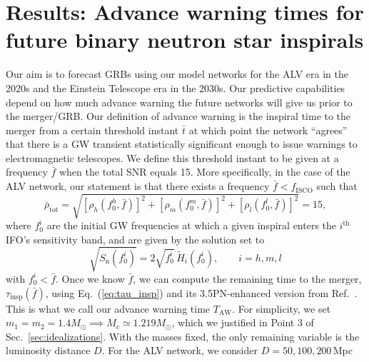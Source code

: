 \documentclass[prd,amsmath,amssymb,aps,floats,amsfonts,notitlepage,superscriptaddress,eqsecnum,nofootinbib,10pt]{revtex4-1}
\newcommand{\f}{\frac}
\newcommand{\be}{\begin{equation}}
\newcommand{\ee}{\end{equation}}
\begin{document}
\section{Results: Advance warning times for future binary neutron star inspirals}\label{sec:results}
 Our aim is to forecast GRBs using our model networks for the ALV era in the 2020s
 and the Einstein Telescope era in the 2030s.
 Our predictive capabilities depend on how much advance warning the future networks will give us prior to the merger/GRB.
 Our definition of advance warning is the inspiral time to the merger from a certain threshold instant $\bar{t}$ at which point the network ``agrees'' that there is a GW transient
 statistically significant enough to issue warnings to electromagnetic telescopes.
 We define this threshold instant to be given at a frequency $\bar{f}$ when the total SNR equals 15. 
 More specifically, in the case of the ALV network, our statement is that there exists a frequency $\bar{f} < f_\text{ISCO}$ such that
 \be
 \bar\rho_\text{tot}= \sqrt{\left[\rho_h(f_0^h,\bar{f})\right]^2+\left[\rho_m(f_0^m,\bar{f})\right]^2+\left[\rho_l(f_0^l,\bar{f})\right]^2}=15, \label{eq:SNR_bar}%
 \ee
 where $f_0^i$ are the initial GW frequencies at which a given inspiral enters the $i^\text{th}$ IFO's sensitivity band, and
 are given by the solution set to
 \be
 \sqrt{S_\text{n}(f_0^i)} = 2\sqrt{f_0^i}\, \tilde{H}_i(f_0^i) \label{eq:f0},\qquad i=h,m,l
 \ee
 with $f_0^i < \bar{f}$.
 Once we know $\bar{f}$, we can compute the remaining time to the merger, $\tau_\text{insp}(\bar{f})$, using Eq.~(\ref{eq:tau_insp})
 and its 3.5PN-enhanced version from Ref.~\cite{Blanchet_LRR}. This is what we call our advance warning time $T_\text{AW}$.
 For simplicity, we set $m_1=m_2=1.4 M_\odot \implies M_c\simeq 1.219 M_\odot$, which we justified in
 Point 3 of Sec.~\ref{sec:idealizations}. 
 With the masses fixed, the only remaining variable is the 
 luminosity distance $D$.
For the ALV network, we consider $D=50,100,200\,$Mpc 
\end{document}

